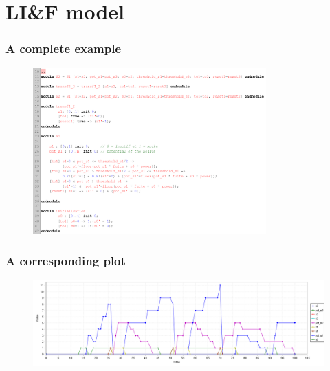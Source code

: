 \section{LI\&F model}


\begin{frame}
  \frametitle{A complete example}

  \begin{figure}
    \includegraphics[width=0.8\textwidth]{pic/simple_serie_complex.png}
  \end{figure}

\end{frame}

\begin{frame}
  \frametitle{A corresponding plot}

  \begin{figure}
    \includegraphics[width=\textwidth]{pic/simple_serie_complex_plot.png}

  \end{figure}

\end{frame}